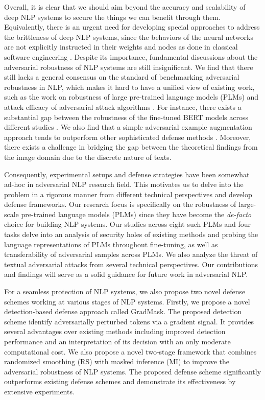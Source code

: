 Overall, it is clear that we should aim beyond the accuracy and scalability of deep NLP systems to secure the things we can benefit through them. Equivalently, there is an urgent need for developing special approaches to address the brittleness of deep NLP systems, since the behaviors of the neural networks are not explicitly instructed in their weights and nodes as done in classical software engineering \citep{Hendrycks21_Safety}. Despite its importance, fundamental discussions about the adversarial robustness of NLP systems are still insignificant. We find that there still lacks a general consensus on the standard of benchmarking adversarial robustness in NLP, which makes it hard to have a unified view of existing work, such as the work on robustness of large pre-trained language models (PLMs) and attack efficacy of adversarial attack algorithms \citep{li-etal-2021-searching}. For instance, there exists a substantial gap between the robustness of the fine-tuned BERT \citep{bert} models across different studies \citep{Dong2021, yoo2021towardsimproving, zhang-etal-2022-improving,Hauser2021}. We also find that a simple adversarial example augmentation approach tends to outperform other sophisticated defense methods \citep{zhu2020freelb,wang2021infobert}. Moreover, there exists a challenge in bridging the gap between the theoretical findings from the image domain due to the discrete nature of texts. 

Consequently, experimental setups and defense strategies have been somewhat ad-hoc in adversarial NLP research field. This motivates us to delve into the problem in a rigorous manner from different technical perspectives and develop defense frameworks. Our research focus is specifically on the robustness of large-scale pre-trained language models (PLMs) since they have become the \textit{de-facto} choice for building NLP systems. Our studies across eight such PLMs and four tasks delve into an analysis of security holes of existing methods and probing the language representations of PLMs throughout fine-tuning, as well as transferability of adversarial samples across PLMs. We also analyze the threat of textual adversarial attacks from several technical perspectives. Our contributions and findings will serve as a solid guidance for future work in adversarial NLP.


For a seamless protection of NLP systems, we also propose two novel defense schemes working at various stages of NLP systems. Firstly, we propose a novel detection-based defense approach called GradMask. The proposed detection scheme identify adversarially perturbed tokens via a gradient signal. It provides several advantages over existing methods including improved detection performance and an interpretation of its decision with an only moderate computational cost. We also propose a novel two-stage framework that combines randomized smoothing (RS) with masked inference (MI) to improve the adversarial robustness of NLP systems. The proposed defense scheme significantly outperforms existing defense schemes and demonstrate its effectiveness by extensive experiments. 


